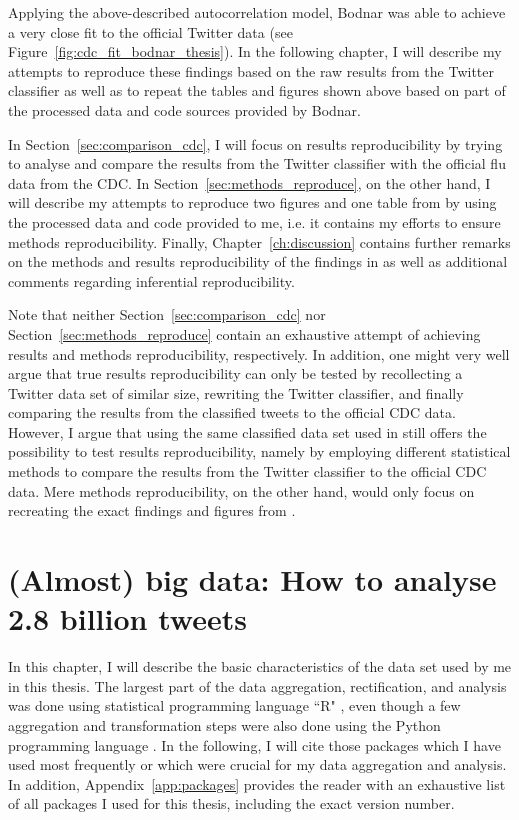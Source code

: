 \documentclass[11pt, a4paper,twoside]{report}\usepackage[]{graphicx}\usepackage[]{color}
\begin{document}
Applying the above-described autocorrelation model, Bodnar was able to achieve a very close fit to the official Twitter data (see Figure~\ref{fig:cdc_fit_bodnar_thesis}). In the following chapter, I will describe my attempts to reproduce these findings based on the raw results from the Twitter classifier as well as to repeat the tables and figures shown above based on part of the processed data and code sources provided by Bodnar. 

In Section~\ref{sec:comparison_cdc}, I will focus on results reproducibility by trying to analyse and compare the results from the Twitter classifier with the official flu data from the CDC. In Section~\ref{sec:methods_reproduce}, on the other hand, I will describe my attempts to reproduce two figures and one table from \cite{bodnar_data_2015} by using the processed data and code provided to me, i.e. it contains my efforts to ensure methods reproducibility. Finally, Chapter~\ref{ch:discussion} contains further remarks on the methods and results reproducibility of the findings in \cite{bodnar_data_2015} as well as additional comments regarding inferential reproducibility.

Note that neither Section~\ref{sec:comparison_cdc} nor Section~\ref{sec:methods_reproduce} contain an exhaustive attempt of achieving results and methods reproducibility, respectively. In addition, one might very well argue that true results reproducibility can only be tested by recollecting a Twitter data set of similar size, rewriting the Twitter classifier, and finally comparing the results from the classified tweets to the official CDC data. However, I argue that using the same classified data set used in \cite{bodnar_data_2015} still offers the possibility to test results reproducibility, namely by employing different statistical methods to compare the results from the Twitter classifier to the official CDC data. Mere methods reproducibility, on the other hand, would only focus on recreating the exact findings and figures from \cite{bodnar_data_2015}.

\thispagestyle{empty}
\cleardoublepage

\chapter{(Almost) big data: How to analyse 2.8 billion tweets}
\label{ch:data_set_description}
In this chapter, I will describe the basic characteristics of the data set used by me in this thesis. The largest part of the data aggregation, rectification, and analysis was done using statistical programming language ``R" \citep{rbase_2017}, even though a few aggregation and transformation steps were also done using the Python programming language \citep{rossum_1995_python}. In the following, I will cite those packages which I have used most frequently or which were crucial for my data aggregation and analysis. In addition, Appendix~\ref{app:packages} provides the reader with an exhaustive list of all packages I used for this thesis, including the exact version number.
\end{document}
